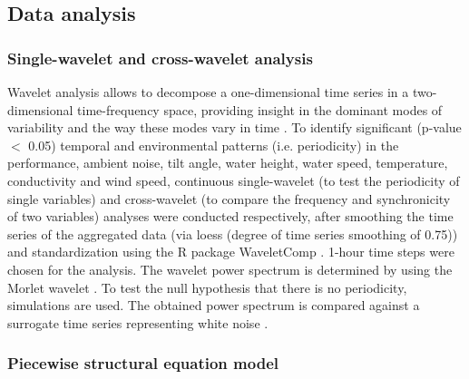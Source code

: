 \documentclass[doublespacing,linenumbers]{bmcart}
\begin{document}
\subsection*{Data analysis}

\subsubsection*{Single-wavelet and cross-wavelet analysis}

Wavelet analysis allows to decompose a one-dimensional time series in a two-dimensional time-frequency space, providing insight in the dominant modes of variability and the way these modes vary in time \cite{Torrence1998}. To identify significant (p-value $<$ 0.05) temporal and environmental patterns (i.e. periodicity) in the performance, ambient noise, tilt angle, water height, water speed, temperature, conductivity and wind speed, continuous single-wavelet (to test the periodicity of single variables) and cross-wavelet (to compare the frequency and synchronicity of two variables) analyses were conducted respectively, after smoothing the time series of the aggregated data (via loess (degree of time series smoothing of 0.75)) and standardization using the R package WaveletComp \cite{Rosch2018WaveletComp:1.1.}.  1-hour time steps were chosen for the analysis. The wavelet power spectrum is determined by using the Morlet wavelet \cite{Shipley2000AGraphs}. To test the null hypothesis that there is no periodicity, simulations are used. The obtained power spectrum is compared against a surrogate time series representing white noise \cite{Nason2014WhiteWavelets}.

\subsubsection*{Piecewise structural equation model}
\label{methods:psem}
\end{document}
